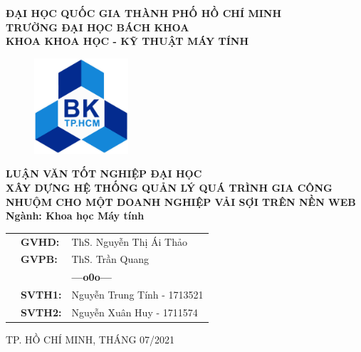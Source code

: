 \documentclass[a4paper,12pt,fleqn,print,oneside]{extarticle}
\begin{document}
\begin{titlepage}
\begin{center}
\textbf{{\Large ĐẠI HỌC QUỐC GIA THÀNH PHỐ HỒ CHÍ MINH \\
TRƯỜNG ĐẠI HỌC BÁCH KHOA \\
KHOA KHOA HỌC - KỸ THUẬT MÁY TÍNH}}
\end{center}

\vspace{0.5cm}

\begin{figure}[h!]
\begin{center}
\includegraphics[width=3.5cm]{Image/hcmut.png}
\end{center}
\end{figure}

\vspace{0.5cm}


\begin{center}
\textbf{{\Large LUẬN VĂN TỐT NGHIỆP ĐẠI HỌC}}\\
\vspace{1cm}
\textbf{{\Large XÂY DỰNG HỆ THỐNG QUẢN LÝ QUÁ TRÌNH GIA CÔNG NHUỘM CHO MỘT DOANH NGHIỆP VẢI SỢI TRÊN NỀN WEB}}\\
\vspace{1cm}
\textbf{{\Large Ngành: Khoa học Máy tính}}
\end{center}

\vspace{2cm}

\begin{table}[h]
\renewcommand{\arraystretch}{1.5}
\begin{tabular}{lll}
\hspace{5 cm}
& \textbf{{\large GVHD:}} & {\large ThS. Nguyễn Thị Ái Thảo} \\
& \textbf{{\large GVPB:}} & {\large ThS. Trần Quang}\\
&  & \textbf{---o0o---} \\
& \textbf{{\large SVTH1:}} & {\large Nguyễn Trung Tính - 1713521} \\
& \textbf{{\large SVTH2:}} & {\large Nguyễn Xuân Huy - 1711574} \\
\end{tabular}
\end{table}

\begin{center}
{\footnotesize {\large TP. HỒ CHÍ MINH, THÁNG 07/2021}}
\end{center}
\end{titlepage}
\end{document}
